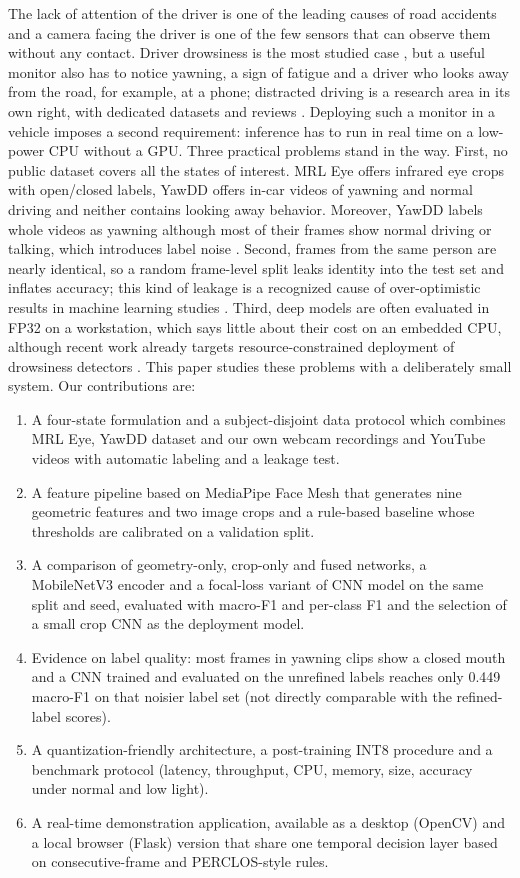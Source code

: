 \documentclass[conference]{IEEEtran}
\begin{document}
The lack of attention of the driver is one of the leading causes of road accidents and a camera facing the driver is one of the few sensors that can observe them without any contact. Driver drowsiness is the most studied case \cite{fonseca2025,fu2024,fu2024app}, but a useful monitor also has to notice yawning, a sign of fatigue and a driver who looks away from the road, for example, at a phone; distracted driving is a research area in its own right, with dedicated datasets and reviews \cite{wang2023,dontoh2025}. Deploying such a monitor in a vehicle imposes a second requirement: inference has to run in real time on a low-power CPU without a GPU.
Three practical problems stand in the way. First, no public dataset covers all the states of interest. MRL Eye \cite{mrl, fusek2018} offers infrared eye crops with open/closed labels, YawDD \cite{yawdd} offers in-car videos of yawning and normal driving and neither contains looking away behavior. Moreover, YawDD labels whole videos as yawning although most of their frames show normal driving or talking, which introduces label noise \cite{mujtaba2025}. Second, frames from the same person are nearly identical, so a random frame-level split leaks identity into the test set and inflates accuracy; this kind of leakage is a recognized cause of over-optimistic results in machine learning studies \cite{kapoor2023}. Third, deep models are often evaluated in FP32 on a workstation, which says little about their cost on an embedded CPU, although recent work already targets resource-constrained deployment of drowsiness detectors \cite{alajlan2023}.
This paper studies these problems with a deliberately small system. Our contributions are:
\begin{enumerate}
    \item A four-state formulation and a subject-disjoint data protocol which combines MRL Eye, YawDD dataset and our own webcam recordings and YouTube videos with automatic labeling and a leakage test.
    \item A feature pipeline based on MediaPipe Face Mesh that generates nine geometric features and two image crops and a rule-based baseline whose thresholds are calibrated on a validation split.
    \item A comparison of geometry-only, crop-only and fused networks, a MobileNetV3 encoder and a focal-loss variant of CNN model on the same split and seed, evaluated with macro-F1 and per-class F1 and the selection of a small crop CNN as the deployment model.
    \item Evidence on label quality: most frames in yawning clips show a closed mouth and a CNN trained and evaluated on the unrefined labels reaches only 0.449 macro-F1 on that noisier label set (not directly comparable with the refined-label scores).
    \item A quantization-friendly architecture, a post-training INT8 procedure and a benchmark protocol (latency, throughput, CPU, memory, size, accuracy under normal and low light).
    \item A real-time demonstration application, available as a desktop (OpenCV) and a local browser (Flask) version that share one temporal decision layer based on consecutive-frame and PERCLOS-style rules.
\end{enumerate}
\end{document}
